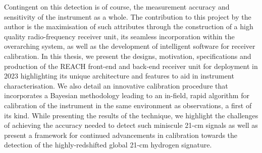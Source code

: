 Contingent on this detection is of course, the measurement accuracy and sensitivity of the instrument as a whole. The contribution to this project by the author is the maximisation of such attributes through the construction of a high quality radio-frequency receiver unit, its seamless incorporation within the overarching system, as well as the development of intelligent software for receiver calibration. In this thesis, we present the designs, motivation, specifications and production of the REACH front-end and back-end receiver unit for deployment in 2023 highlighting its unique architecture and features to aid in instrument characterisation. We also detail an innovative calibration procedure that incorporates a Bayesian methodology leading to an in-field, rapid algorithm for calibration of the instrument in the same environment as observations, a first of its kind. While presenting the results of the technique, we highlight the challenges of achieving the accuracy needed to detect such miniscule 21-cm signals as well as present a framework for continued advancements in calibration towards the detection of the highly-redshifted global 21-cm hydrogen signature.

